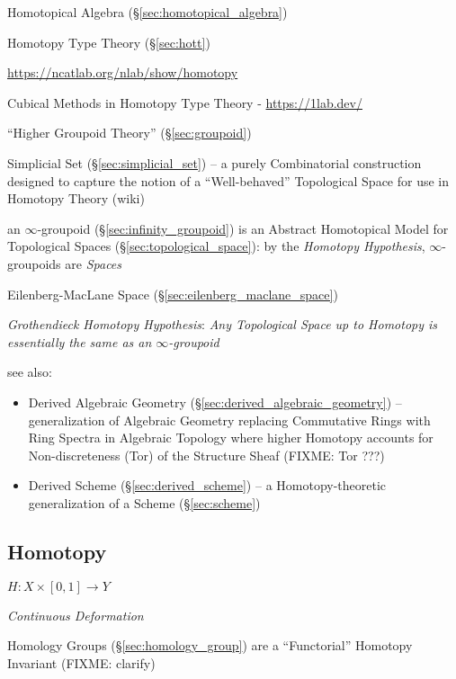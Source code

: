 Homotopical Algebra (\S\ref{sec:homotopical_algebra})

Homotopy Type Theory (\S\ref{sec:hott})

\url{https://ncatlab.org/nlab/show/homotopy}

Cubical Methods in Homotopy Type Theory - \url{https://1lab.dev/}

``Higher Groupoid Theory'' (\S\ref{sec:groupoid})

Simplicial Set (\S\ref{sec:simplicial_set}) -- a purely Combinatorial
construction designed to capture the notion of a ``Well-behaved'' Topological
Space for use in Homotopy Theory (wiki)

\fist an $\infty$-groupoid (\S\ref{sec:infinity_groupoid}) is an Abstract
Homotopical Model for Topological Spaces (\S\ref{sec:topological_space}): by the
\emph{Homotopy Hypothesis}, $\infty$-groupoids are \emph{Spaces}

Eilenberg-MacLane Space (\S\ref{sec:eilenberg_maclane_space})

\emph{Grothendieck Homotopy Hypothesis}:
\emph{
  Any Topological Space up to Homotopy is essentially the same as an
  $\infty$-groupoid
}

see also:
\begin{itemize}
  \item Derived Algebraic Geometry (\S\ref{sec:derived_algebraic_geometry}) --
    generalization of Algebraic Geometry replacing Commutative Rings with Ring
    Spectra in Algebraic Topology where higher Homotopy accounts for
    Non-discreteness (Tor) of the Structure Sheaf (FIXME: Tor ???)
  \item Derived Scheme (\S\ref{sec:derived_scheme}) -- a Homotopy-theoretic
    generalization of a Scheme (\S\ref{sec:scheme})
\end{itemize}



\subsection{Homotopy}\label{sec:homotopy}

$H : X \times [0,1] \rightarrow Y$

\emph{Continuous Deformation}

Homology Groups (\S\ref{sec:homology_group}) are a ``Functorial'' Homotopy
Invariant (FIXME: clarify)



